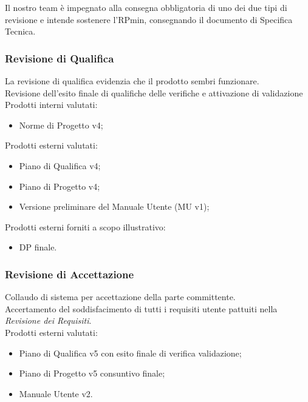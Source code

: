 \documentclass[12pt,a4paper,titlepage]{article}
\begin{document}
	Il nostro team è impegnato alla consegna obbligatoria di uno dei due tipi di revisione e intende sostenere l'RPmin, consegnando il documento di Specifica Tecnica.
	
	\subsubsection{Revisione di Qualifica}
	La revisione di qualifica evidenzia che il prodotto sembri funzionare. \\
	Revisione dell'esito finale di qualifiche delle verifiche e attivazione di validazione \\
	Prodotti interni valutati:
	\begin{itemize}
		\item Norme di Progetto v4;
	\end{itemize}
	Prodotti esterni valutati:
	\begin{itemize}
		\item Piano di Qualifica v4;
		\item Piano di Progetto v4;
		\item Versione preliminare del Manuale Utente (MU v1);
	\end{itemize}
	Prodotti esterni forniti a scopo illustrativo:
	\begin{itemize}
		\item DP finale.
	\end{itemize}
	
	\subsubsection{Revisione di Accettazione}
	Collaudo di sistema per accettazione della parte committente.\\
	Accertamento del soddisfacimento di tutti i requisiti utente pattuiti nella \textit{Revisione dei Requisiti}.\\
	Prodotti esterni valutati:
	\begin{itemize}
		\item Piano di Qualifica v5 con esito finale di verifica validazione;
		\item Piano di Progetto v5 consuntivo finale;
		\item Manuale Utente v2.
	\end{itemize}
	
	\newpage
	
\end{document}
